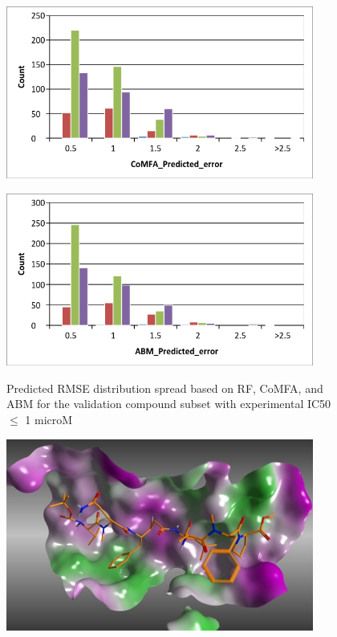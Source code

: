 \begin{figure}
  \centering
  \includegraphics[width=0.9\textwidth]{Images/bace_fig5B.png}
  \label{fig:bace_5B}
\end{figure}

\begin{figure}
  \centering
  \includegraphics[width=0.9\textwidth]{Images/bace_fig5C.png}
  \label{fig:bace_5C}
  \caption{Predicted RMSE distribution spread based on RF, CoMFA, and ABM for the validation compound subset with experimental IC50 $\leq$ 1 microM}
\end{figure}


\begin{figure}
  \centering
  \includegraphics[width=0.9\textwidth]{Images/bace_scheme1.jpg}
  \label{fig:bace_scheme1}
\end{figure}

